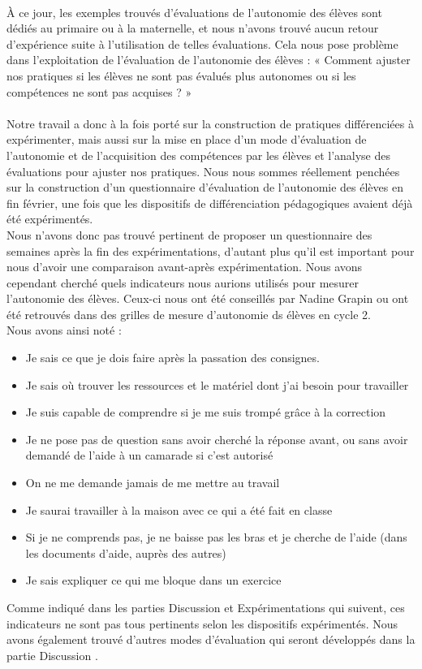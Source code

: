 \paragraph{}À ce jour, les exemples trouvés d’évaluations de l’autonomie des élèves sont dédiés au primaire ou à la maternelle\cite{pedagogie_cooperative_hierarchie}, et nous n’avons trouvé aucun retour d’expérience suite à l’utilisation de telles évaluations. Cela nous pose problème dans l’exploitation de l’évaluation de l’autonomie des élèves : « Comment ajuster nos pratiques si les élèves ne sont pas évalués plus autonomes ou si les compétences ne sont pas acquises ? »

\paragraph{}Notre travail a donc à la fois porté sur la construction de pratiques différenciées à expérimenter, mais aussi sur la mise en place d’un mode d’évaluation de l’autonomie et de l’acquisition des compétences par les élèves et l’analyse des évaluations pour ajuster nos pratiques. Nous nous sommes réellement penchées sur la construction d'un questionnaire d'évaluation de l'autonomie des élèves en fin février, une fois que les dispositifs de différenciation pédagogiques avaient déjà été expérimentés.\\
Nous n'avons donc pas trouvé pertinent de proposer un questionnaire des semaines après la fin des expérimentations, d'autant plus qu'il est important pour nous d'avoir une comparaison avant-après expérimentation. Nous avons cependant cherché quels indicateurs nous aurions utilisés pour mesurer l'autonomie des élèves. Ceux-ci nous ont été conseillés par Nadine Grapin ou ont été retrouvés dans des grilles de mesure d'autonomie ds élèves en cycle 2\cite{Grille_autonomie}.\\
Nous avons ainsi noté :
\begin{itemize}
	\item \og Je sais ce que je dois faire après la passation des
	consignes.\fg{}
	\item \og Je sais où trouver les ressources et le matériel dont j'ai besoin pour travailler \fg{}
	\item \og Je suis capable de comprendre si je me suis trompé grâce à la correction \fg{}
	\item \og Je ne pose pas de question sans avoir cherché la réponse avant, ou sans avoir demandé de l'aide à un camarade si c'est autorisé \fg{}
	\item \og On ne me demande jamais de me mettre au travail \fg{}
	\item \og Je saurai travailler à la maison avec ce qui a été fait en classe \fg{}
	\item \og Si je ne comprends pas, je ne baisse pas les bras et je cherche de l'aide (dans les documents d'aide, auprès des autres) \fg{}
	\item \og Je sais expliquer ce qui me bloque dans un exercice \fg{}
\end{itemize}
Comme indiqué dans les parties \og Discussion \fg{} et \og Expérimentations \fg{} qui suivent, ces indicateurs ne sont pas tous pertinents selon les dispositifs expérimentés. Nous avons également trouvé d'autres modes d'évaluation qui seront développés dans la partie \og Discussion \fg{}.
